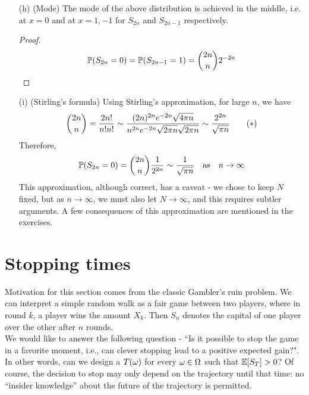 \documentclass[main]{subfiles}
\begin{document}
\begin{obs}
\begin{enumerate}
            \item[(h)](Mode) The mode of the above distribution is achieved in the middle, i.e. at $ x=0 $ and at $ x=1,-1 $ for $ S_{2n} $ and $ S_{2n-1} $ respectively.

            \begin{proof}
                \[\P(S_{2n}=0)=\P(S_{2n-1}=1)=\binom{2n}{n}2^{-2n}\]
            \end{proof}

            \item[(i)](Stirling's formula) Using Stirling's approximation, for large $ n $, we have
            \[\binom{2n}{n}=\f{2n!}{n!n!}\sim\f{(2n)^{2n}e^{-2n}\sqrt{4\pi n}}{n^{2n}e^{-2n}\sqrt{2\pi n}\sqrt{2\pi n}}\sim\f{2^{2n}}{\sqrt{\pi n}}\tag{$ \ast $}\]
            Therefore,
            \[\P(S_{2n}=0)=\binom{2n}{n}\f{1}{2^{2n}}\sim\f{1}{\sqrt{\pi n}}\text{\quad as\quad $ n\to\infty $}\]
            This approximation, although correct, has a caveat - we chose to keep $ N $ fixed, but as $ n\to\infty $, we must also let $ N\to\infty $, and this requires subtler arguments. A few consequences of this approximation are mentioned in the exercises.\\


    \end{enumerate}
\end{obs}

\section{Stopping times}

Motivation for this section comes from the classic Gambler's ruin problem. We can interpret a simple random walk as a fair game between two players, where in round $ k $, a player wins the amount $ X_k $. Then $ S_n $ denotes the capital of one player over the other after $ n $ rounds.\\

We would like to answer the following question - ``Is it possible to stop the game in a favorite moment, i.e., can clever stopping lead to a positive expected gain?". In other words, can we design a $ T(\o) $ for every $ \o\in\O $ such that $ \E[S_T] > 0 $? Of course, the decision to stop may only depend on the trajectory until that time: no ``insider knowledge” about the future of the trajectory is permitted.\\
\end{document}
